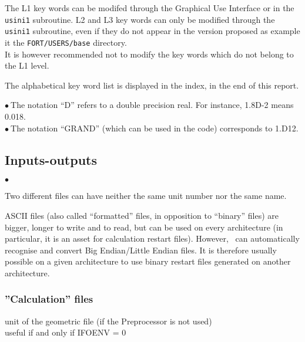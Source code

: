 The L1 key words can be modifed through the Graphical Use Interface or
in the \texttt{usini1} subroutine. L2 and L3 key words can only be modified through
the \texttt{usini1} subroutine, even if they do not appear in the version proposed
as example it the \texttt{FORT/USERS/base} directory.\\
It is however recommended not to modify the key words which do not belong to the L1
level.

The alphabetical key word list is displayed in the index, in the end of
this report.

$\bullet\ $The notation ``D'' refers to a double precision real. For
	   instance, 1.8D-2 means 0.018. \\
$\bullet\ $The notation ``GRAND'' (which can be used in the code)
corresponds to 1.D12.

\subsection{Inputs-outputs}

\begin{list}{$\bullet$}{}
\item Two different files can have neither the same unit number nor the
      same name.
\item  ASCII files (also called ``formatted'' files, in opposition to
      ``binary'' files) are bigger, longer to write and to read, but can
      be used on every architecture (in particular, it is an asset for
      calculation restart files). However, \CS\ can automatically recognise and 
      convert Big Endian/Little Endian files. It is therefore usually possible on
      a given architecture to use binary restart files generated on another
      architecture.
 \end{list}

\subsubsection{''Calculation'' files}



{unit of the geometric file (if the Preprocessor is not used)\\
useful if and only if IFOENV = 0}

